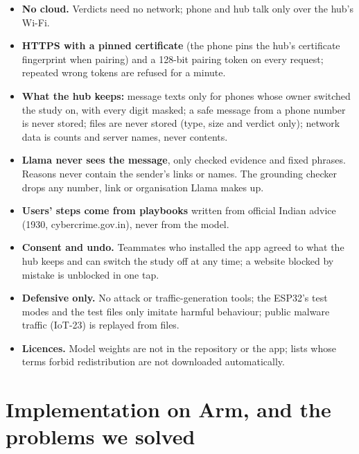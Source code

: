 \documentclass[11pt,a4paper]{article}
\begin{document}
\begin{itemize}
  \item \textbf{No cloud.} Verdicts need no network; phone and hub talk only over the hub's Wi-Fi.
  \item \textbf{HTTPS with a pinned certificate} (the phone pins the hub's certificate fingerprint when pairing) and a
        128-bit pairing token on every request; repeated wrong tokens are refused for a minute.
  \item \textbf{What the hub keeps:} message texts only for phones whose owner switched the study on, with every digit
        masked; a safe message from a phone number is never stored; files are never stored (type, size and verdict only);
        network data is counts and server names, never contents.
  \item \textbf{Llama never sees the message}, only checked evidence and fixed phrases. Reasons never contain the
        sender's links or names. The grounding checker drops any number, link or organisation Llama makes up.
  \item \textbf{Users' steps come from playbooks} written from official Indian advice (1930, cybercrime.gov.in), never
        from the model.
  \item \textbf{Consent and undo.} Teammates who installed the app agreed to what the hub keeps and can switch the study
        off at any time; a website blocked by mistake is unblocked in one tap.
  \item \textbf{Defensive only.} No attack or traffic-generation tools; the ESP32's test modes and the test files only
        imitate harmful behaviour; public malware traffic (IoT-23) is replayed from files.
  \item \textbf{Licences.} Model weights are not in the repository or the app; lists whose terms forbid redistribution
        are not downloaded automatically.
\end{itemize}

\section{Implementation on Arm, and the problems we solved}
\label{sec:impl}
\end{document}
